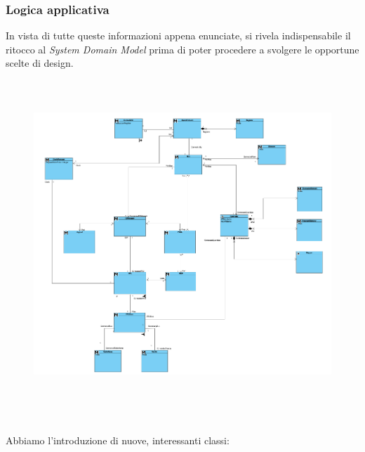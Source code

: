 \documentclass[11pt]{article}
\begin{document}
\subsubsection{Logica applicativa}
In vista di tutte queste informazioni appena enunciate, si rivela indispensabile il ritocco al \emph{System Domain Model} prima di poter procedere a svolgere le opportune scelte di design.
\begin{figure}[!h]
\hspace*{-3.3cm}
\centering
\includegraphics[width=525px, height=465px]{CD_DomainModel_2.png}
\end{figure}\\
Abbiamo l'introduzione di nuove, interessanti classi:
\end{document}
